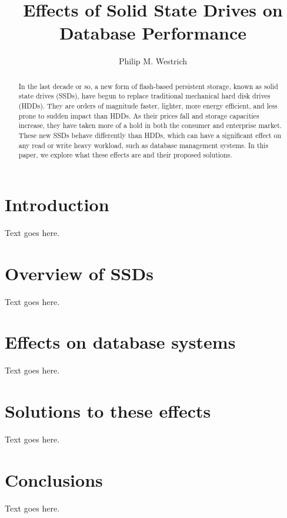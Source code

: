 \documentclass[format=acmsmall, review=false, screen=true]{acmart}
\begin{document}
\title[Short Title]{Effects of Solid State Drives on Database Performance}  
\author{Philip M. Westrich}

\begin{abstract}

    In the last decade or so, a new form of flash-based persistent storage, known as solid state drives (SSDs), have begun 
    to replace traditional mechanical hard disk drives (HDDs). They are orders of magnitude faster, lighter, more energy 
    efficient, and less prone to sudden impact than HDDs. As their prices fall and storage capacities increase, they have 
    taken more of a hold in both the consumer and enterprise market. These new SSDs behave differently than HDDs, which can 
    have a significant effect on any read or write heavy workload, such as database management systems. In this paper, we explore 
    what these effects are and their proposed solutions.
 
\end{abstract}

\maketitle

\section{Introduction}

Text goes here.

\section{Overview of SSDs}

Text goes here.

\section{Effects on database systems}

Text goes here.

\section{Solutions to these effects}

Text goes here.

\section{Conclusions}

Text goes here.



\end{document}
